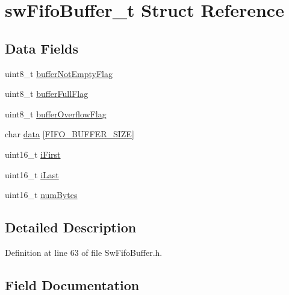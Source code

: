 \hypertarget{structsw_fifo_buffer__t}{}\section{sw\+Fifo\+Buffer\+\_\+t Struct Reference}
\label{structsw_fifo_buffer__t}
\subsection*{Data Fields}
\begin{DoxyCompactItemize}
\item 
uint8\+\_\+t \hyperlink{structsw_fifo_buffer__t_a5c7c40846fb9a0ce25dba8e99824ad8a}{buffer\+Not\+Empty\+Flag}
\item 
uint8\+\_\+t \hyperlink{structsw_fifo_buffer__t_a8c291f4e2fda846402115081e5a750e7}{buffer\+Full\+Flag}
\item 
uint8\+\_\+t \hyperlink{structsw_fifo_buffer__t_a9bbab1b668fb5a7f96f07478634a50f6}{buffer\+Overflow\+Flag}
\item 
char \hyperlink{structsw_fifo_buffer__t_a0b595a1d13af47083fedafee8e29e26e}{data} \mbox{[}\hyperlink{_sw_fifo_buffer_8h_ad73fd7fab7940b2765b6a7054fc591dd}{F\+I\+F\+O\+\_\+\+B\+U\+F\+F\+E\+R\+\_\+\+S\+I\+Z\+E}\mbox{]}
\item 
uint16\+\_\+t \hyperlink{structsw_fifo_buffer__t_a407513a78db2ae65a38a95646668164e}{i\+First}
\item 
uint16\+\_\+t \hyperlink{structsw_fifo_buffer__t_a37b7c86bf28a0d6c402cd80d41a7abd1}{i\+Last}
\item 
uint16\+\_\+t \hyperlink{structsw_fifo_buffer__t_a05db6308e5fee7d2591c4bc4e21505da}{num\+Bytes}
\end{DoxyCompactItemize}


\subsection{Detailed Description}


Definition at line 63 of file Sw\+Fifo\+Buffer.\+h.



\subsection{Field Documentation}
\hypertarget{structsw_fifo_buffer__t_a5c7c40846fb9a0ce25dba8e99824ad8a}{}

